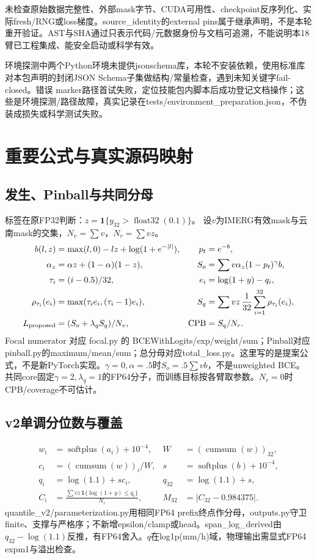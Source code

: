 \documentclass[UTF8,fontset=fandol,10pt]{ctexart}
\begin{document}
未检查原始数据完整性、外部mask字节、CUDA可用性、checkpoint反序列化、实际fresh/\allowbreak{}RNG或loss梯度。source\_\allowbreak{}identity的external pins属于继承声明，不是本轮重开验证。AST与SHA通过只表示代码/\allowbreak{}元数据身份与文档可追溯，不能说明本18臂已工程集成、能安全启动或科学有效。

环境探测中两个Python环境未提供jsonschema库，本轮不安装依赖，使用标准库对本包声明的封闭JSON Schema子集做结构/\allowbreak{}常量检查，遇到未知关键字fail-closed。错误 marker路径首试失败，定位技能包内脚本后成功登记文档操作；这些是环境探测/\allowbreak{}路径故障，真实记录在tests/\allowbreak{}environment\_\allowbreak{}preparation.json，不伪装成损失或科学测试失败。\clearpage\section{重要公式与真实源码映射}
\subsection{发生、Pinball与共同分母}
标签在原FP32判断：\(z=\mathbf1\{y_{32}>\operatorname{float32}(0.1)\}\)。
设\(v\)为IMERG有效mask与云南mask的交集，\(N_v=\sum v\)，\(N_r=\sum vz\)。
\begin{align*}
b(l,z)&=\max(l,0)-lz+\log(1+e^{-|l|}), &p_t&=e^{-b},\\
\alpha_z&=\alpha z+(1-\alpha)(1-z), & S_o&=\sum v\alpha_z(1-p_t)^\gamma b,\\
\tau_i&=(i-0.5)/32,&e_i&=\log(1+y)-q_i,\\
\rho_{\tau_i}(e_i)&=\max(\tau_i e_i,(\tau_i-1)e_i), & S_q&=\sum vz\,\frac1{32}\sum_{i=1}^{32}\rho_{\tau_i}(e_i),\\
L_{\rm proposed}&=(S_o+\lambda_q S_q)/N_v, &\operatorname{CPB}&=S_q/N_r.
\end{align*}
Focal numerator 对应 focal.py 的 BCEWithLogits/exp/weight/sum；Pinball对应pinball.py的maximum/mean/sum；总分母对应total\_loss.py。这里写的是提案公式，不是新PyTorch实现。\(\gamma=0,\alpha=.5\)时\(S_o=.5\sum vb\)，不是unweighted BCE。共同core固定\(\gamma=2,\lambda_q=1\)的FP64分子，而训练目标按各臂取参数。\(N_r=0\)时CPB/coverage不可估计。
\subsection{v2单调分位数与覆盖}
\begin{align*}
w_i&=\operatorname{softplus}(a_i)+10^{-4}, & W&=\left(\operatorname{cumsum}(w)\right)_{32},\\
c_i&=\left(\operatorname{cumsum}(w)\right)_i/W,&s&=\operatorname{softplus}(b)+10^{-4},\\
q_i&=\log(1.1)+s c_i,&q_{32}&=\log(1.1)+s,\\
C_i&=\frac{\sum vz\,\mathbf1\{\log(1+y)\le q_i\}}{N_r},&M_{32}&=|C_{32}-0.984375|.
\end{align*}
quantile\_v2/parameterization.py用相同FP64 prefix终点作分母，outputs.py守卫finite、支撑与严格序；不新增epsilon/clamp或head。span\_log\_derived由\(q_{32}-\log(1.1)\)反推，有FP64舍入。\(q\)在log1p(mm/h)域，物理输出需显式FP64 expm1与溢出检查。
\end{document}
